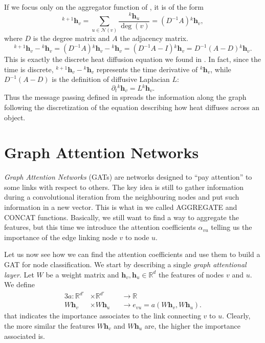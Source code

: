 \documentclass[12pt,a4paper]{report}
\theoremstyle{definition}
\begin{document}
If we focus only on the aggregator function of , it is of the form
\begin{equation*}
    ^{k+1}\mathbf{h}_v = \sum _{u\in \mathcal{N}(v)} \frac{ ^k \mathbf{h}_u}{\deg (v)} = ( D^{-1} A ) {^{k}\mathbf{h}_v } ,
\end{equation*}
where $D$ is the degree matrix and $A$ the adjacency matrix.
\begin{equation*}
     ^{k+1}\mathbf{h}_v - {^{k}\mathbf{h}_v } =( D^{-1} A ) {^{k}\mathbf{h}_v } - {^{k}\mathbf{h}_v }  = (D^{-1}A - I) {^{k}\mathbf{h}_v } = D^{-1} (A - D) {^{k}\mathbf{h}_v } .
\end{equation*}
This is exactly the discrete heat diffusion equation we found in .
In fact, since the time is discrete, $^{k+1}\mathbf{h}_v - {^{k}\mathbf{h}_v }$ represents the time derivative of ${^{k}\mathbf{h}_v }$, while $D^{-1}(A-D)$ is the definition of diffusive Laplacian $L$:
\begin{equation*}
    \partial_t {^{k}\mathbf{h}_v } = L {^{k}\mathbf{h}_v }.
\end{equation*}
Thus the message passing defined in  spreads the information along the graph following the discretization of the equation describing how heat diffuses across an object.


\section{Graph Attention Networks}
\label{sec:GAT}

\emph{Graph Attention Networks} (GATs) are networks designed to ``pay attention'' to some links with respect to others.
The key idea is still to gather information during a convolutional iteration from the neighbouring nodes and put such information in a new vector.
This is what in  we called AGGREGATE and CONCAT functions.
Basically, we still want to find a way to aggregate the features, but this time we introduce the attention coefficients $\alpha _{vu}$ telling us the importance of the edge linking node $v$ to node $u$.

Let us now see how we can find the attention coefficients and use them to build a GAT for node classification.
We start by describing a single \emph{graph attentional layer}.
Let $W$ be a weight matrix and $\textbf{h}_v, \textbf{h}_u \in \mathbb{R}^d$ the features of nodes $v$ and $u$.
We define
\begin{alignat*}{3}
    a:  \mathbb{R}^{d'} &\times \mathbb{R}^{d'} &&\longrightarrow \mathbb{R} \\
          W \textbf{h}_v &\times W \textbf{h}_u &&\longrightarrow e_{vu} = a(W \textbf{h}_v, W \textbf{h}_u) .
\end{alignat*}
that indicates the importance associates to the link connecting $v$ to $u$.
Clearly, the more similar the features $W \textbf{h}_v$ and $W \textbf{h}_u$ are, the higher the importance associated is.
\end{document}
